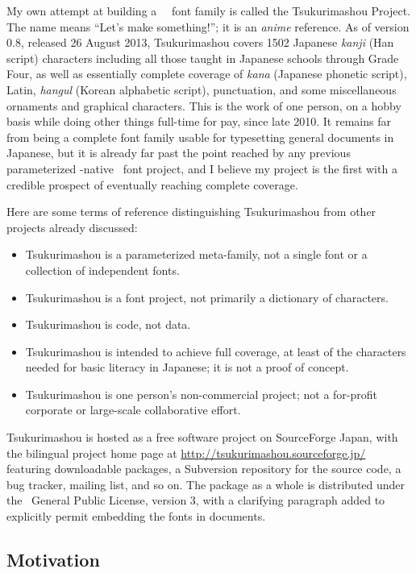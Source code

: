 \documentclass{ltugboat}
\begin{document}
My own attempt at building a \MF\ \CJK\ font family is called the
Tsukurimashou Project.  The name means ``Let's
make something!''; it is an \emph{anime} reference.  As of version 0.8,
released 26 August 2013, Tsukurimashou covers 1502 Japanese \emph{kanji}
(Han script) characters including all those taught in Japanese schools
through Grade Four, as well as essentially complete coverage of \emph{kana}
(Japanese phonetic script), Latin, \emph{hangul} (Korean alphabetic script),
punctuation, and some miscellaneous ornaments and graphical characters. 
This is the work of one person, on a hobby basis while doing other things
full-time for pay, since late 2010.  It remains far from being a complete
font family usable for typesetting general documents in Japanese, but it is
already far past the point reached by any previous parameterized \MF-native
\CJK\ font project, and I believe my project is the first with a credible
prospect of eventually reaching complete coverage.

Here are some terms of reference distinguishing Tsukurimashou from other
projects already discussed:
\begin{itemize}
\item Tsukurimashou is a parameterized meta-family, not a single font or
a collection of independent fonts.
\item Tsukurimashou is a font project, not primarily a dictionary of
characters.
\item Tsukurimashou is code, not data.
\item Tsukurimashou is intended to achieve full coverage, at least of the
characters needed for basic literacy in Japanese; it is not a
proof of concept.
\item Tsukurimashou is one person's non-commercial project; not a for-profit
corporate or large-scale collaborative effort.
\end{itemize}

Tsukurimashou is hosted as a free software project on SourceForge Japan,
with the bilingual project home page at
\url{http://tsukurimashou.sourceforge.jp/} featuring downloadable packages,
a Subversion repository for the source code, a bug tracker, mailing list,
and so on.  The package as a whole is distributed under the \GNU\ General
Public License, version 3, with a clarifying paragraph added to explicitly
permit embedding the fonts in documents.

\subsection{Motivation}
\end{document}
